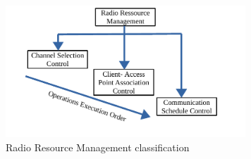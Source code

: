 \documentclass[journal,transmag]{IEEEtran}
\begin{document}
\begin{figure}[t]
\centering
\includegraphics[width=9cm]{Figures/Radio_ressource_management.pdf}
\caption{Radio Resource Management classification}
\label{fig:RRM}
\end{figure}
\end{document}
